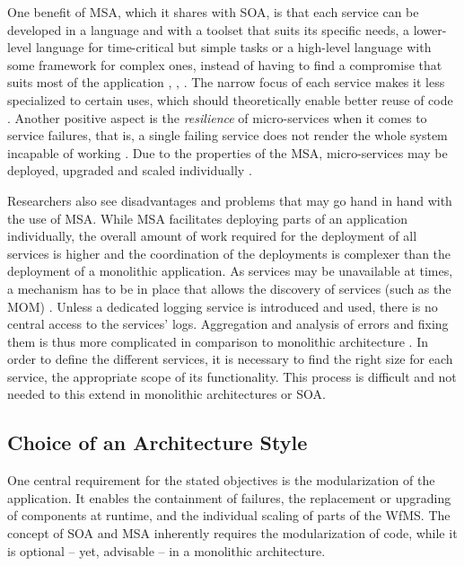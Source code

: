    One benefit of \ac{MSA}, which it shares with \ac{SOA}, is that each service can be developed in a language and with a toolset that suits its specific needs, \eg a lower-level language for time-critical but simple tasks or a high-level language with some framework for complex ones, instead of having to find a compromise that suits most of the application  \cite[p.~35]{Stubbs2015Distributed}, \cite[p.~4]{Newman2015Building}, \cite[p.~113]{Thones2015Microservices}.
    The narrow focus of each service makes it less specialized to certain uses, which should theoretically enable better reuse of code \cite[p.~35]{Stubbs2015Distributed}.
    Another positive aspect is the \emph{resilience} of micro-services when it comes to service failures, that is, a single failing service does not render the whole system incapable of working \cite[p.~5]{Newman2015Building}.
    Due to the properties of the \ac{MSA}, micro-services may be deployed, upgraded and scaled individually \cite[p.~116]{Thones2015Microservices}.

    Researchers also see disadvantages and problems that may go hand in hand with the use of \ac{MSA}.
    While \ac{MSA} facilitates deploying parts of an application individually, the overall amount of work required for the deployment of all services is higher and the coordination of the deployments is complexer than the deployment of a monolithic application.
    As services may be unavailable at times, a mechanism has to be in place that allows the discovery of services (such as the \ac{MOM}) \cite[p.~35]{Stubbs2015Distributed}.
    Unless a dedicated logging service is introduced and used, there is no central access to the services' logs. Aggregation and analysis of errors and fixing them is thus more complicated in comparison to monolithic architecture \cite[p.~35]{Stubbs2015Distributed}.
    In order to define the different services, it is necessary to find the right size for each service, \ie the appropriate scope of its functionality. This process is difficult and not needed to this extend in monolithic architectures or \ac{SOA}.


\subsection{Choice of an Architecture Style} %
  \label{sub:choice_of_an_achitecture_model}

  One central requirement for the stated objectives is the modularization of the application. It enables the containment of failures, the replacement or upgrading of components at runtime, and the individual scaling of parts of the \ac{WfMS}. The concept of \ac{SOA} and \ac{MSA} inherently requires the modularization of code, while it is optional -- yet, advisable -- in a monolithic architecture.

